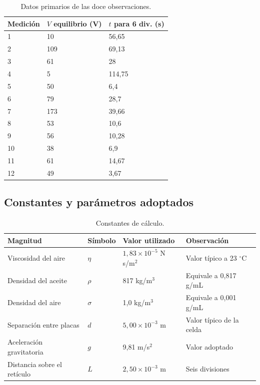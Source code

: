 \documentclass{article}
\begin{document}
\begin{table}[H]
\centering
\small
\caption{Datos primarios de las doce observaciones.}
\begin{tabular}{@{}C{1.8cm}C{2.9cm}C{3.3cm}@{}}
    \toprule
    \textbf{Medición} & \textbf{$V$ equilibrio (V)} & \textbf{$t$ para 6 div. (s)} \\
      & 10  & 56,65 \\
    2  & 109 & 69,13 \\
    3  & 61  & 28 \\
    4  & 5   & 114,75 \\
    5  & 50  & 6,4 \\
    6  & 79  & 28,7 \\
    7  & 173 & 39,66 \\
    8  & 53  & 10,6 \\
    9  & 56  & 10,28 \\
    10 & 38  & 6,9 \\
    11 & 61  & 14,67 \\
    12 & 49  & 3,67 \\
    \bottomrule
\end{tabular}
\end{table}

\subsection{Constantes y parámetros adoptados}

\begin{table}[H]
\centering
\small
\caption{Constantes de cálculo.}
\begin{tabular}{@{}L{3.8cm}C{1.7cm}L{3.7cm}L{4.0cm}@{}}
    \toprule
    \textbf{Magnitud} & \textbf{Símbolo} & \textbf{Valor utilizado} & \textbf{Observación} \\
    \midrule
    Viscosidad del aire & $\eta$ & $1,83\times10^{-5}$ N s/m$^2$ & Valor típico a 23 $^{\circ}$C \\
    Densidad del aceite & $\rho$ & 817 kg/m$^3$ & Equivale a 0,817 g/mL \\
    Densidad del aire & $\sigma$ & 1,0 kg/m$^3$ & Equivale a 0,001 g/mL \\
    Separación entre placas & $d$ & $5,00\times10^{-3}$ m & Valor típico de la celda \\
    Aceleración gravitatoria & $g$ & 9,81 m/s$^2$ & Valor adoptado \\
    Distancia sobre el retículo & $L$ & $2,50\times10^{-3}$ m & Seis divisiones \\
    \bottomrule
\end{tabular}
\end{table}
\end{document}
